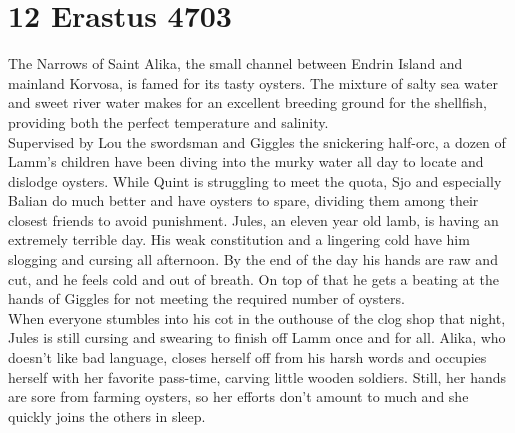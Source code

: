 \section{12 Erastus 4703}

The Narrows of Saint Alika, the small channel between Endrin Island and mainland Korvosa, is famed for its tasty oysters. The mixture of salty sea water and sweet river water makes for an excellent breeding ground for the shellfish, providing both the perfect temperature and salinity.\\

Supervised by Lou the swordsman and Giggles the snickering half-orc, a dozen of Lamm's children have been diving into the murky water all day to locate and dislodge oysters. While Quint is struggling to meet the quota, Sjo and especially Balian do much better and have oysters to spare, dividing them among their closest friends to avoid punishment. Jules, an eleven year old lamb, is having an extremely terrible day. His weak constitution and a lingering cold have him slogging and cursing all afternoon. By the end of the day his hands are raw and cut, and he feels cold and out of breath. On top of that he gets a beating at the hands of Giggles for not meeting the required number of oysters.\\

When everyone stumbles into his cot in the outhouse of the clog shop that night, Jules is still cursing and swearing to finish off Lamm once and for all. Alika, who doesn't like bad language, closes herself off from his harsh words and occupies herself with her favorite pass-time, carving little wooden soldiers. Still, her hands are sore from farming oysters, so her efforts don't amount to much and she quickly joins the others in sleep.\\


